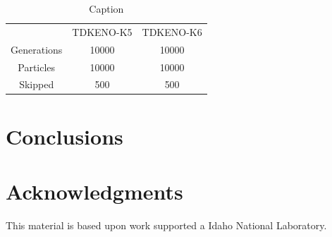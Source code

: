 \documentclass{anstrans}
\begin{document}
\begin{table}[h]
    \centering
    \begin{tabular}{c|c|c}
         & TDKENO-K5 & TDKENO-K6 \\
        Generations &  10000 & 10000 \\
        Particles   &  10000 & 10000 \\
        Skipped     &  500   & 500  \\
    \end{tabular}
    \caption{Caption}
    \label{tab:my_label}
\end{table}

\section{Conclusions}


%

\section{Acknowledgments}
This material is based upon work supported a Idaho National Laboratory.



\end{document}
